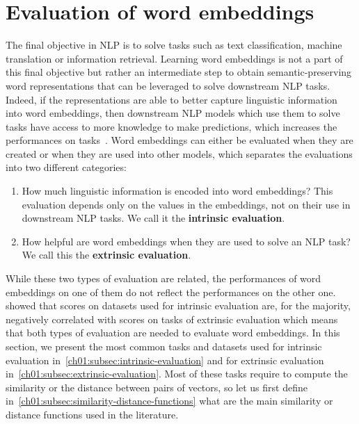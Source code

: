\section{Evaluation of word embeddings}
  \label{ch01:sec:word-embeddings-evaluation}
  The final objective in NLP is to solve tasks such as text classification,
  machine translation or information retrieval. Learning word embeddings is not
  a part of this final objective but rather an intermediate step to obtain
  semantic-preserving word representations that can be leveraged to solve
  downstream NLP tasks. Indeed, if the representations are able to better
  capture linguistic information into word embeddings, then downstream NLP
  models which use them to solve tasks have access to more knowledge to make
  predictions, which increases the performances on tasks~\citep{kim2016intent,
  bojanowski2016enriching}. Word embeddings can either be evaluated when they
  are created or when they are used into other models, which separates the
  evaluations into two different categories:

  \begin{enumerate}
    \item How much linguistic information is encoded into word embeddings? This
      evaluation depends only on the values in the embeddings, not on their use
      in downstream NLP tasks. We call it the \textbf{intrinsic evaluation}.
    \item How helpful are word embeddings when they are used to solve an NLP
      task? We call this the \textbf{extrinsic evaluation}.
  \end{enumerate}

  \noindent While these two types of evaluation are related, the performances of
  word embeddings on one of them do not reflect the performances on the other
  one.~\citeauthor{chiu2016intrinsic}~\citep{chiu2016intrinsic} showed that
  scores on datasets used for intrinsic evaluation are, for the majority,
  negatively correlated with scores on tasks of extrinsic evaluation which means
  that both types of evaluation are needed to evaluate word embeddings. In this
  section, we present the most common tasks and datasets used for intrinsic
  evaluation in~\autoref{ch01:subsec:intrinsic-evaluation} and for extrinsic
  evaluation in~\autoref{ch01:subsec:extrinsic-evaluation}. Most of these tasks
  require to compute the similarity or the distance between pairs of vectors, so
  let us first define in~\autoref{ch01:subsec:similarity-distance-functions}
  what are the main similarity or distance functions used in the literature.

